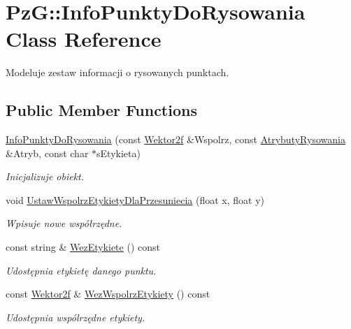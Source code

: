 \hypertarget{class_pz_g_1_1_info_punkty_do_rysowania}{}\section{PzG\+::Info\+Punkty\+Do\+Rysowania Class Reference}
\label{class_pz_g_1_1_info_punkty_do_rysowania}


Modeluje zestaw informacji o rysowanych punktach.  


\subsection*{Public Member Functions}
\begin{DoxyCompactItemize}
\item 
\mbox{\hyperlink{class_pz_g_1_1_info_punkty_do_rysowania_aed0725576cd5cf0ac01fc2e528e2c85b}{Info\+Punkty\+Do\+Rysowania}} (const \mbox{\hyperlink{class_pz_g_1_1_wektor2f}{Wektor2f}} \&Wspolrz, const \mbox{\hyperlink{class_pz_g_1_1_atrybuty_rysowania}{Atrybuty\+Rysowania}} \&Atryb, const char $\ast$s\+Etykieta)
\begin{DoxyCompactList}\small\item\em Inicjalizuje obiekt. \end{DoxyCompactList}\item 
void \mbox{\hyperlink{class_pz_g_1_1_info_punkty_do_rysowania_aee45bb223dcbb35b32934eba41a723c6}{Ustaw\+Wspolrz\+Etykiety\+Dla\+Przesuniecia}} (float x, float y)
\begin{DoxyCompactList}\small\item\em Wpisuje nowe współrzędne. \end{DoxyCompactList}\item 
const string \& \mbox{\hyperlink{class_pz_g_1_1_info_punkty_do_rysowania_a385228b5ac60713d115d37d267524ec3}{Wez\+Etykiete}} () const
\begin{DoxyCompactList}\small\item\em Udostępnia etykietę danego punktu. \end{DoxyCompactList}\item 
const \mbox{\hyperlink{class_pz_g_1_1_wektor2f}{Wektor2f}} \& \mbox{\hyperlink{class_pz_g_1_1_info_punkty_do_rysowania_a8903b837a2c97c8aede88324d316ac6e}{Wez\+Wspolrz\+Etykiety}} () const
\begin{DoxyCompactList}\small\item\em Udostępnia wspólrzędne etykiety. \end{DoxyCompactList}\item 

\end{DoxyCompactItemize}
